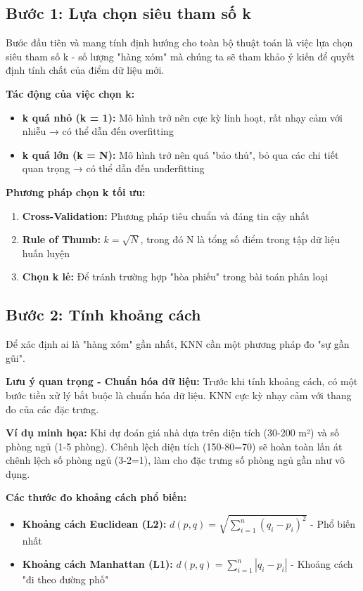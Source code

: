 \subsection{Bước 1: Lựa chọn siêu tham số k}

Bước đầu tiên và mang tính định hướng cho toàn bộ thuật toán là việc lựa chọn siêu tham số k - số lượng "hàng xóm" mà chúng ta sẽ tham khảo ý kiến để quyết định tính chất của điểm dữ liệu mới.

\textbf{Tác động của việc chọn k:}
\begin{itemize}
\item \textbf{k quá nhỏ (k = 1):} Mô hình trở nên cực kỳ linh hoạt, rất nhạy cảm với nhiễu → có thể dẫn đến overfitting
\item \textbf{k quá lớn (k = N):} Mô hình trở nên quá "bảo thủ", bỏ qua các chi tiết quan trọng → có thể dẫn đến underfitting
\end{itemize}

\textbf{Phương pháp chọn k tối ưu:}
\begin{enumerate}
\item \textbf{Cross-Validation:} Phương pháp tiêu chuẩn và đáng tin cậy nhất
\item \textbf{Rule of Thumb:} $k = \sqrt{N}$, trong đó N là tổng số điểm trong tập dữ liệu huấn luyện
\item \textbf{Chọn k lẻ:} Để tránh trường hợp "hòa phiếu" trong bài toán phân loại
\end{enumerate}

\subsection{Bước 2: Tính khoảng cách}

Để xác định ai là "hàng xóm" gần nhất, KNN cần một phương pháp đo "sự gần gũi". 

\textbf{Lưu ý quan trọng - Chuẩn hóa dữ liệu:}
Trước khi tính khoảng cách, có một bước tiền xử lý bắt buộc là chuẩn hóa dữ liệu. KNN cực kỳ nhạy cảm với thang đo của các đặc trưng.

\textbf{Ví dụ minh họa:} Khi dự đoán giá nhà dựa trên diện tích (30-200 m²) và số phòng ngủ (1-5 phòng). Chênh lệch diện tích (150-80=70) sẽ hoàn toàn lấn át chênh lệch số phòng ngủ (3-2=1), làm cho đặc trưng số phòng ngủ gần như vô dụng.

\textbf{Các thước đo khoảng cách phổ biến:}
\begin{itemize}
\item \textbf{Khoảng cách Euclidean (L2):} $d(p,q) = \sqrt{\sum_{i=1}^{n}(q_i-p_i)^2}$ - Phổ biến nhất
\item \textbf{Khoảng cách Manhattan (L1):} $d(p,q) = \sum_{i=1}^{n}|q_i-p_i|$ - Khoảng cách "đi theo đường phố"
\end{itemize}

